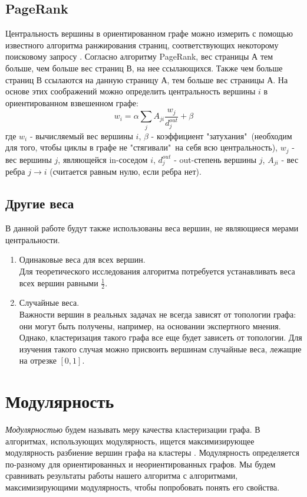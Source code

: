 	\subsection{PageRank}
	Центральность вершины в ориентированном графе можно измерить с помощью известного алгоритма ранжирования страниц, соответствующих некоторому поисковому запросу \cite{pagerankcent}. Согласно алгоритму PageRank, вес страницы А тем больше, чем больше вес страниц В, на нее ссылающихся. Также чем больше страниц В ссылаются на данную страницу А, тем больше вес страницы А. На основе этих соображений можно определить центральность вершины $i$ в ориентированном взвешенном графе:
	\begin{equation}
	w_i = \alpha \sum_j A_{ji} \frac{w_j}{d_j^{out}}+\beta
	\end{equation}
	где $w_i$ - вычисляемый вес вершины $i$, $\beta$ - коэффициент "затухания"\ (необходим для того, чтобы циклы в графе не "стягивали"\ на себя всю центральность), $w_j$ - вес вершины $j$, являющейся in-соседом $i$, $d_j^{out}$ - out-степень вершины $j$, $A_{ji}$ - вес ребра $j\rightarrow i$ (считается равным нулю, если ребра нет).
	
	\subsection{Другие веса}
	В данной работе будут также использованы веса вершин, не являющиеся мерами центральности.
	
	\begin{enumerate}
		\item Одинаковые веса для всех вершин.\\
		Для теоретического исследования алгоритма потребуется устанавливать веса всех вершин равными $\frac{1}{2}$.
		
		\item Случайные веса.\\
		Важности вершин в реальных задачах не всегда зависят от топологии графа: они могут быть получены, например, на основании экспертного мнения. Однако, кластеризация такого графа все еще будет зависеть от топологии. Для изучения такого случая можно присвоить вершинам случайные веса, лежащие на отрезке $[0,1]$.
	\end{enumerate}

\section{Модулярность}
\textit{Модулярностью} будем называть меру качества кластеризации графа. В алгоритмах, использующих модулярность, ищется максимизирующее модулярность разбиение вершин графа на кластеры \cite{modularity}. Модулярность определяется по-разному для ориентированных и неориентированных графов. Мы будем сравнивать результаты работы нашего алгоритма с алгоритмами, максимизирующими модулярность, чтобы попробовать понять его свойства.\\

